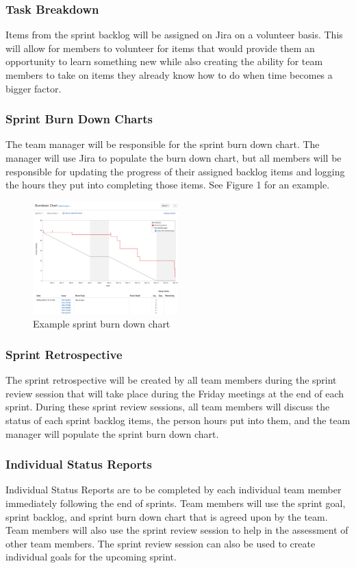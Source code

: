 \subsubsection{Task Breakdown}
Items from the sprint backlog will be assigned on Jira on a volunteer basis. This will allow for members to volunteer for items that would provide them an opportunity to learn something new while also creating the ability for team members to take on items they already know how to do when time becomes a bigger factor.

\subsubsection{Sprint Burn Down Charts}
The team manager will be responsible for the sprint burn down chart. The manager will use Jira to populate the burn down chart, but all members will be responsible for updating the progress of their assigned backlog items and logging the hours they put into completing those items. See Figure 1 for an example.

\begin{figure}[h!]
    \centering
    \includegraphics[width=0.5\textwidth]{images/burndown}
    \caption{Example sprint burn down chart}
\end{figure}

\subsubsection{Sprint Retrospective}
The sprint retrospective will be created by all team members during the sprint review session that will take place during the Friday meetings at the end of each sprint. During these sprint review sessions, all team members will discuss the status of each sprint backlog items, the person hours put into them, and the team manager will populate the sprint burn down chart.

\subsubsection{Individual Status Reports}
Individual Status Reports are to be completed by each individual team member immediately following the end of sprints. Team members will use the sprint goal, sprint backlog, and sprint burn down chart that is agreed upon by the team. Team members will also use the sprint review session to help in the assessment of other team members. The sprint review session can also be used to create individual goals for the upcoming sprint. 

